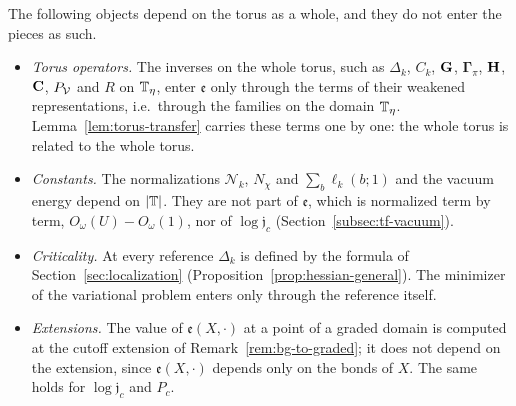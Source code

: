 \begin{remark}\label{rem:global-objects}
The following objects depend on the torus as a whole, and they do not enter the pieces as such.
\begin{itemize}
\item \emph{Torus operators.} The inverses on the whole torus, such as $\Delta_k$, $C_k$, $\mathbf G$, $\boldsymbol\Gamma_\pi$, $\mathbf H$, $\mathbf C$, $P_\mathcal V$ and $R$ on $\mathbb T_\eta$, enter $\mathfrak e$ only through the terms of their weakened representations, i.e.\ through the families on the domain $\mathbb T_\eta$. Lemma~\ref{lem:torus-transfer} carries these terms one by one: the whole torus is related to the whole torus.
\item \emph{Constants.} The normalizations $\mathcal N_k$, $N_\chi$ and $\sum_b\ell_k(b;1)$ and the vacuum energy depend on $|\mathbb T|$. They are not part of $\mathfrak e$, which is normalized term by term, $O_\omega(U)-O_\omega(1)$, nor of $\log\mathfrak j_c$ (Section~\ref{subsec:tf-vacuum}).
\item \emph{Criticality.} At every reference $\Delta_k$ is defined by the formula of Section~\ref{sec:localization} (Proposition~\ref{prop:hessian-general}). The minimizer of the variational problem enters only through the reference itself.
\item \emph{Extensions.} The value of $\mathfrak e(X,\cdot)$ at a point of a graded domain is computed at the cutoff extension of Remark~\ref{rem:bg-to-graded}; it does not depend on the extension, since $\mathfrak e(X,\cdot)$ depends only on the bonds of $X$. The same holds for $\log\mathfrak j_c$ and $P_c$.
\end{itemize}
\end{remark}

